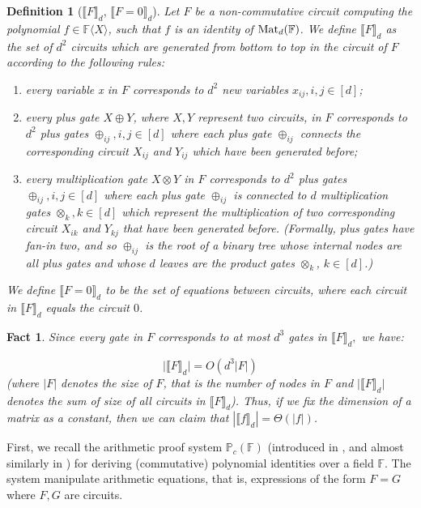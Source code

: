 \documentclass[12pt,reqno]{article}
\newtheorem{definition}{Definition}
\newtheorem{fact}[theorem]{Fact}
\newcommand\F{\ensuremath{\mathbb F}}
\newcommand\PP{{\mathbb P}}
\newcommand\PC{\ensuremath{\PP_c}}
\newcommand{\matd}{{\ensuremath{{\rm Mat}_d(\F)}}}
\newcommand{\freea}{\ensuremath{\F\langle X\rangle}}
\newcommand{\iddocomment}[2][]
{\todo[size=\tiny, caption={#2}, #1, linecolor=green!70!white,         backgroundcolor=blue!10!white,bordercolor=white]
{{#2}}}
\newcommand{\convert}[1]{\llbracket#1\rrbracket_d}
\begin{document}
\begin{definition}[$\convert{F}$, $\convert{F=0}$]
\label{def:double-bracket}
 Let $F$ be a non-commutative circuit computing the polynomial $f\in\freea$, such that $f$ is an identity of \matd. We define
$\convert{F}$ as  the  set of $d^2$ circuits which are generated  from  bottom to top in the circuit of $F$ according to the following rules:
\begin{enumerate}

\item every variable x in $F$ corresponds to $d^2$ new variables $x_{ij},i,j\in[d]$;
\item every plus gate $X\oplus Y$, where $X,Y$ represent two circuits, in $F$ corresponds to $d^2$ plus gates $\oplus_{ij},i,j\in[d]$ where each plus gate $\oplus_{ij}$ connects the corresponding circuit $X_{ij}$ and $Y_{ij}$ which have been generated before; \iddocomment{"generated before.." is unclear}
\item every multiplication gate $X\otimes Y$ in $F$ corresponds to $d^2$ plus gates $\oplus_{ij},i,j\in[d]$ where each plus gate $\oplus_{ij} $  is connected to $d$ multiplication gates $\otimes_k,k\in[d]$ which represent the multiplication of two corresponding circuit $X_{ik}$ and $Y_{kj}$ that have been generated before. (Formally, plus gates have \emph{fan-in two}, and so $\oplus_{ij}$ is the root of a binary tree whose internal nodes are all plus gates and whose $d$ leaves are the product gates $\otimes_k$, $k\in[d]$.)

\end{enumerate}
We define $\convert{F=0}$ to be the set of equations between circuits, where each circuit in $\convert{F}$ equals the circuit $0$.
\end{definition}
\begin{fact}
Since every gate in $F$ corresponds  to at most $d^3$ gates in $\convert{F},$ we have:

$$\big|\convert{F}\big|=O\left(d^3 |F| \right)$$
(where $|F|$ denotes the size of $F$, that is  the number
of nodes in $F$ and $\big|\convert{F}\big|$ denotes the sum of size of all circuits in $\convert{F}$). Thus, if we fix the dimension of a matrix as a constant, then we can claim that $|\convert{f}|=\Theta(|f|)$.
\end{fact}

First, we recall the arithmetic proof system $\PC(\F)$ (introduced  in \cite{HT12}, and almost similarly in \cite{HT08}) for deriving (commutative) polynomial identities over a field  $\F$. The system manipulate arithmetic equations, that is, expressions of the form $F = G$ where  $F, G$ are circuits.
\end{document}

